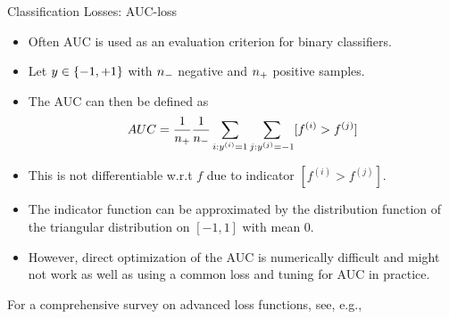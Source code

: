 \documentclass[11pt,compress,t,notes=noshow, xcolor=table]{beamer}
\begin{document}
\begin{vbframe}{Classification Losses: AUC-loss}

\begin{itemize}
\item Often AUC is used as an evaluation criterion for binary classifiers.
\item Let $y \in \setmp$ with $\nn$ negative and $\np$ positive samples. %
\item The AUC can then be defined as
$$AUC = \frac{1}{\np} \frac{1}{\nn} \sum_{i: \yi = 1} \sum_{j: \yi[j] = -1} [f^{(i)} > f^{(j)}]$$
\item This is not differentiable w.r.t $f$ due to indicator $[f^{(i)} > f^{(j)}]$.
\item The indicator function can be approximated by the distribution function of the triangular distribution on $[-1, 1]$ with mean $0$.
\item However, direct optimization of the AUC is numerically difficult and might not work as well as using 
a common loss and tuning for AUC in practice.

\end{itemize}

For a comprehensive survey on advanced loss functions, see, e.g., 

\end{vbframe}





\endlecture
\end{document}
